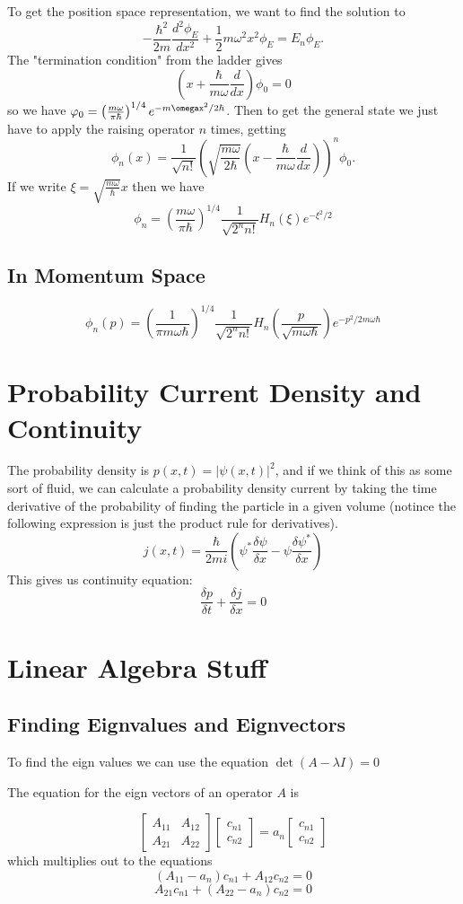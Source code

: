 \documentclass{homework}
\newcommand{\m}[1]{\begin{bmatrix} #1 \end{bmatrix}}
\begin{document}
To get the position space representation, we want to find the solution to 
\[-\frac{\hbar^2}{2m}\frac{d^2\phi_E}{dx^2}+ \frac{1}{2}m\omega^2 x^2 \phi_E = E_n \phi_E.\]
The "termination condition" from the ladder gives
\[(x+ \frac{\hbar}{m\omega}\frac{d}{dx})\phi_0 = 0\]
so we have $\phi_0 = \left( \frac{m\omega}{\pi\hbar}\right)^{1/4}e^{-m\omegax^2/2\hbar}$. Then to get the general state we just have to apply the raising operator $n$ times, getting
\[\phi_n(x) = \frac{1}{\sqrt{n!}}\left( \sqrt{\frac{m\omega}{2\hbar}}(x  - \frac{\hbar}{m\omega}\frac{d}{dx})\right)^n\phi_0.\]
If we write $\xi = \sqrt{\frac{m\omega}{\hbar}}x$ then we have 
\[\phi_n = \left( \frac{m\omega}{\pi \hbar}\right)^{1/4}\frac{1}{\sqrt{2^nn!}}H_n(\xi)e^{-\xi^2/2}\]

\subsection{In Momentum Space}
\[\phi_n(p) = \left(\frac{1}{\pi m \omega \hbar} \right)^{1/4}\frac{1}{\sqrt{2^nn!}}H_n(\frac{p}{\sqrt{m\omega\hbar}})e^{-p^2/2m\omega\hbar}\]



\section{Probability Current Density and Continuity}

The probability density is $p(x,t) = |\psi(x,t)|^2$, and if we think of this as some sort of fluid, we can calculate a probability density current by taking the time derivative of the probability of finding the particle in a given volume (notince the following expression is just the product rule for derivatives).
\[j(x,t) = \frac{\hbar}{2mi}(\psi^*\frac{\delta \psi}{\delta x} - \psi\frac{\delta \psi^*}{\delta x})\]
This gives us  continuity equation:
\[\frac{\delta p}{\delta t} + \frac{\delta j}{\delta x} = 0\]

\section{Linear Algebra Stuff}


\subsection{Finding Eignvalues and Eignvectors}

To find the eign values we can use the equation $\det(A - \lambda I) = 0$

The equation for the eign vectors of an operator $A$ is 

\[\m{A_{11} & A_{12} \\ A_{21} & A_{22}}\m{c_{n1} \\ c_{n2}} = a_n \m{c_{n1} \\ c_{n2}}\]
which multiplies out to the equations
\[(A_{11} - a_n)c_{n1} + A_{12}c_{n2} = 0\]
\[A_{21}c_{n1}+ (A_{22}- a_n)c_{n2} = 0\]
\end{document}
